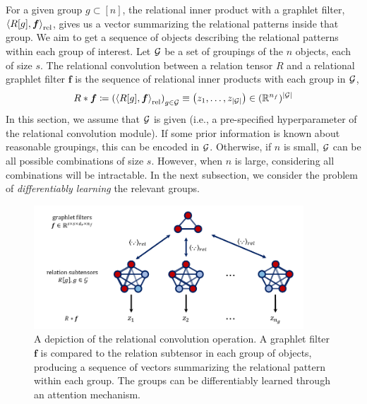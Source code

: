 For a given group $g \subset [n]$, the relational inner product with a graphlet filter, $\left \langle R[g], \bm{f} \right\rangle_\mathrm{rel}$, gives us a vector summarizing the relational patterns inside that group. We aim to get a sequence of objects describing the relational patterns within each group of interest. Let ${\mathcal{G}}$ be a set of groupings of the $n$ objects, each of size $s$. The relational convolution between a relation tensor $R$ and a relational graphlet filter $\bm{f}$ is the sequence of relational inner products with each group in ${\mathcal{G}}$,
\begin{equation}
    \label{eq:relational_convolution}
    R \ast \bm{f} \coloneq \left( \left\langle R[g], \boldsymbol{f} \right\rangle_\mathrm{rel} \right)_{g \in {\mathcal{G}}} \equiv \left(z_1, \ldots, z_{\left\lvert{\mathcal{G}}\right\rvert}\right) \in (\mathbb{R}^{n_f})^{\left\lvert{\mathcal{G}}\right\rvert}
\end{equation}
In this section, we assume that ${\mathcal{G}}$ is given (i.e., a pre-specified hyperparameter of the relational convolution module). If some prior information is known about reasonable groupings, this can be encoded in ${\mathcal{G}}$. Otherwise, if $n$ is small, ${\mathcal{G}}$ can be all possible combinations of size $s$. However, when $n$ is large, considering all combinations will be intractable. In the next subsection, we consider the problem of \textit{differentiably learning} the relevant groups.


\begin{figure}
    \vskip-10pt
    \centering
    \includegraphics[width=0.9\textwidth]{figs/relconv_figs_updated.pdf}
    \caption{A depiction of the relational convolution operation. A graphlet filter $\bm{f}$ is compared to the relation subtensor in each group of objects, producing a sequence of vectors summarizing the relational pattern within each group. The groups can be differentiably learned through an attention mechanism.
    }\label{fig:relconvdiagram}
\end{figure}

